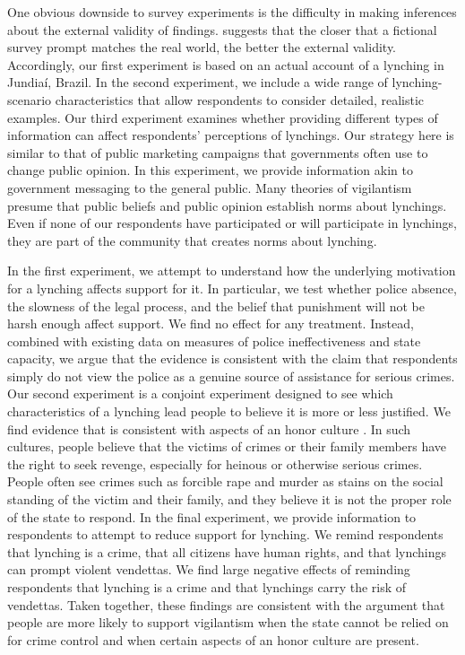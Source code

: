 \documentclass[12pt,ansiapaper]{article}
\begin{document}
One obvious downside to survey experiments is the difficulty in making inferences about the external validity of findings. \citet[17-18]{bateson2020politics} suggests that the closer that a fictional survey prompt matches the real world, the better the external validity. Accordingly, our first experiment is based on an actual account of a lynching in Jundia\'{i}, Brazil. In the second experiment, we include a wide range of lynching-scenario characteristics that allow respondents to consider detailed, realistic examples. Our third experiment examines whether providing different types of information can affect respondents' perceptions of lynchings. Our strategy here is similar to that of public marketing campaigns that governments often use to change public opinion. In this experiment, we provide information akin to government messaging to the general public. Many theories of vigilantism presume that public beliefs and public opinion establish norms about lynchings. Even if none of our respondents have participated or will participate in lynchings, they are part of the community that creates norms about lynching.

In the first experiment, we attempt to understand how the underlying motivation for a lynching affects support for it. In particular, we test whether police absence, the slowness of the legal process, and the belief that punishment will not be harsh enough affect support. We find no effect for any treatment. Instead, combined with existing data on measures of police ineffectiveness and state capacity, we argue that the evidence is consistent with the claim that respondents simply do not view the police as a genuine source of assistance for serious crimes. Our second experiment is a conjoint experiment designed to see which characteristics of a lynching lead people to believe it is more or less justified. We find evidence that is consistent with aspects of an honor culture  \citep{nisbett2018culture,grosjean2014history}. In such cultures, people believe that the victims of crimes or their family members have the right to seek revenge, especially for heinous or otherwise serious crimes. People often see crimes such as forcible rape and murder as stains on the social standing of the victim and their family, and they believe it is not the proper role of the state to respond. In the final experiment, we provide information to respondents to attempt to reduce support for lynching. We remind respondents that lynching is a crime, that all citizens have human rights, and that lynchings can prompt violent vendettas. We find large negative effects of reminding respondents that lynching is a crime and that lynchings carry the risk of vendettas. Taken together, these findings are consistent with the argument that people are more likely to support vigilantism when the state cannot be relied on for crime control and when certain aspects of an honor culture are present.
\end{document}
